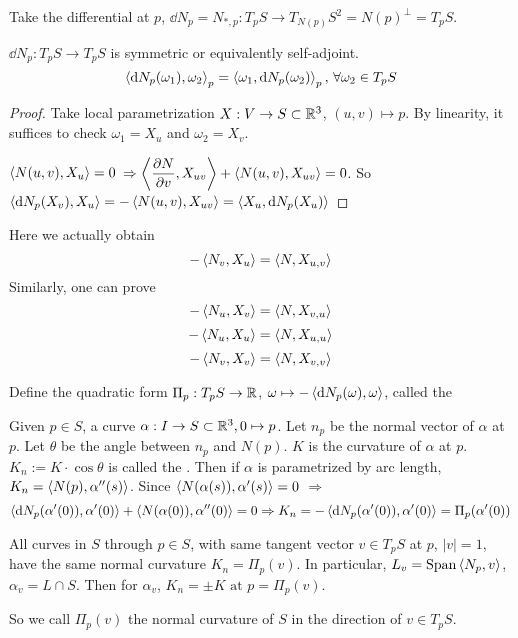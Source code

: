 Take the differential at  $ p $,  $ \dd N_p=N_{*,p}:T_pS\rightarrow T_{N(p)}S^2=N(p)^{\perp}=T_pS $.

\begin{proposition}
     $ \dd N_p:T_pS\rightarrow T_pS $ is symmetric or equivalently self-adjoint. \ie 
     \[\left<\mathrm{d} N_p(\omega_1),\omega_2\right>_p=\left<\omega_1,\mathrm{d} N_p(\omega_2)\right>_p,\,\forall \omega_2 \in T_pS\]
\end{proposition}
\begin{proof}
    Take local parametrization $ X :V\rightarrow S\subset \mathbb R^3 $,  $ (u,v)\mapsto p $.
    By linearity, it suffices to check  $ \omega_1=X_u $ and  $ \omega_2=X_v $.
    
     $ \left<N(u,v),X_u\right>=0 $  $ \Rightarrow\left<\displaystyle\frac{\partial N }{\partial v},X_{uv}\right>+\left<N(u,v),X_{uv}\right>=0 $. So  $ \left<\mathrm{d} N_p(X_v),X_u\right>=-\left<N(u,v),X_{uv}\right>=\left<X_u,\mathrm{d} N_p(X_u)\right> $ 
\end{proof}
\begin{remark}
    Here we actually obtain 
    \[-\left<N_v,X_u\right>=\left<N,X_{u,v}\right>\]
    Similarly, one can prove
    \[-\left<N_u,X_v\right>=\left<N,X_{v,u}\right>\]
    \[-\left<N_u,X_u\right>=\left<N,X_{u,u}\right>\]
    \[-\left<N_v,X_v\right>=\left<N,X_{v,v}\right>\]
\end{remark}
Define the quadratic form  $ \Pi_p:T_pS\rightarrow \mathbb R $,  $ \omega\mapsto -\left<\mathrm{d} N_p(\omega),\omega\right> $, called the   

\begin{definition}
    Given  $ p\in S $, a curve  $ \alpha:I\rightarrow S\subset \mathbb R^3, 0\mapsto p $. Let  $ n_p  $ be the normal vector of  $ \alpha  $ at  $ p  $. Let  $ \theta $ be the angle between  $ n_p $ and  $ N(p) $.  $ K  $ is the curvature of  $ \alpha  $ at  $ p $.  $ K_n:=K\cdot\cos\theta $ is called the . Then if  $ \alpha $ is parametrized by arc length,  $ K_n=\left<N(p),\alpha''(s)\right> $. Since $ \left<N(\alpha(s)),\alpha'(s)\right>=0 $ $ \Rightarrow $ 
    \[\left<\mathrm{d} N_p(\alpha'(0)),\alpha'(0)\right>+\left<N(\alpha(0)),\alpha''(0)\right>=0\Rightarrow K_n=-\left<\mathrm{d} N_p(\alpha'(0)),\alpha'(0)\right>=\Pi_p(\alpha'(0))\]

    
\end{definition}
\begin{theorem}[Meusnier]\label{Meusnier theorem}
    All curves in  $ S $ through  $ p\in S $, with same tangent vector  $ v\in T_pS $ at  $ p $,  $ |v|=1 $, have the same normal curvature  $ K_n=\Pi_p(v) $. In particular,  $ L_v=\mathrm{Span}\left<N_p,v\right> $,  $ \alpha_v=L\cap S $. Then for  $ \alpha_v $,  $ K_n=\pm K\text{ at }p=\Pi_p(v) $. 
    
    So we call  $ \Pi_p(v) $ the normal curvature of  $ S $ in the direction of  $ v\in T_pS $.  
\end{theorem}